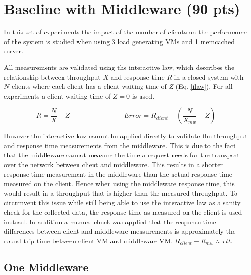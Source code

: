 \documentclass[11pt,a4paper]{article}
\begin{document}
\section{Baseline with Middleware (90 pts)}\label{exp3}


In this set of experiments the impact of the number of clients on the  performance of the system is studied when using 3 load generating VMs and 1 memcached server. 

All measurements are validated using the interactive law, which describes the relationship between throughput $X$ and response time $R$ in a closed system with $N$ clients where each client has a client waiting time of $Z$ (Eq. \ref{ilaw}). For all experiments a client waiting time of $Z = 0$ is used.

\begin{equation}\label{ilaw}
R = \frac{N}{X} - Z
\qquad\qquad\qquad\qquad
Error = R_{client} - (\frac{N}{X_{mw}}  - Z)
\end{equation}

However the interactive law cannot be applied directly to validate the throughput and response time measurements from the middleware.
This is due to the fact that the middleware cannot measure the time a request needs for the transport over the network between client and middleware. This results in a shorter response time measurement in the middleware than the actual response time measured on the client.
Hence when using the middleware response time, this would result in a throughput that is higher than the measured throughput.
To circumvent this issue while still being able to use the interactive law as a sanity check for the collected data, the response time as measured on the client is used instead. In addition a manual check was applied that the response time differences between client and middleware measurements is approximately the round trip time between client VM and middleware VM: $R_{client} - R_{mw} \approx rtt$.


\subsection{One Middleware}\label{exp31}
\end{document}
